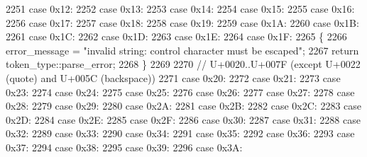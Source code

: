 \begin{DoxyCode}
2251                 \textcolor{keywordflow}{case} 0x12:
2252                 \textcolor{keywordflow}{case} 0x13:
2253                 \textcolor{keywordflow}{case} 0x14:
2254                 \textcolor{keywordflow}{case} 0x15:
2255                 \textcolor{keywordflow}{case} 0x16:
2256                 \textcolor{keywordflow}{case} 0x17:
2257                 \textcolor{keywordflow}{case} 0x18:
2258                 \textcolor{keywordflow}{case} 0x19:
2259                 \textcolor{keywordflow}{case} 0x1A:
2260                 \textcolor{keywordflow}{case} 0x1B:
2261                 \textcolor{keywordflow}{case} 0x1C:
2262                 \textcolor{keywordflow}{case} 0x1D:
2263                 \textcolor{keywordflow}{case} 0x1E:
2264                 \textcolor{keywordflow}{case} 0x1F:
2265                 \{
2266                     error\_message = \textcolor{stringliteral}{"invalid string: control character must be escaped"};
2267                     \textcolor{keywordflow}{return} token\_type::parse\_error;
2268                 \}
2269 
2270                 \textcolor{comment}{// U+0020..U+007F (except U+0022 (quote) and U+005C (backspace))}
2271                 \textcolor{keywordflow}{case} 0x20:
2272                 \textcolor{keywordflow}{case} 0x21:
2273                 \textcolor{keywordflow}{case} 0x23:
2274                 \textcolor{keywordflow}{case} 0x24:
2275                 \textcolor{keywordflow}{case} 0x25:
2276                 \textcolor{keywordflow}{case} 0x26:
2277                 \textcolor{keywordflow}{case} 0x27:
2278                 \textcolor{keywordflow}{case} 0x28:
2279                 \textcolor{keywordflow}{case} 0x29:
2280                 \textcolor{keywordflow}{case} 0x2A:
2281                 \textcolor{keywordflow}{case} 0x2B:
2282                 \textcolor{keywordflow}{case} 0x2C:
2283                 \textcolor{keywordflow}{case} 0x2D:
2284                 \textcolor{keywordflow}{case} 0x2E:
2285                 \textcolor{keywordflow}{case} 0x2F:
2286                 \textcolor{keywordflow}{case} 0x30:
2287                 \textcolor{keywordflow}{case} 0x31:
2288                 \textcolor{keywordflow}{case} 0x32:
2289                 \textcolor{keywordflow}{case} 0x33:
2290                 \textcolor{keywordflow}{case} 0x34:
2291                 \textcolor{keywordflow}{case} 0x35:
2292                 \textcolor{keywordflow}{case} 0x36:
2293                 \textcolor{keywordflow}{case} 0x37:
2294                 \textcolor{keywordflow}{case} 0x38:
2295                 \textcolor{keywordflow}{case} 0x39:
2296                 \textcolor{keywordflow}{case} 0x3A:

\end{DoxyCode}

